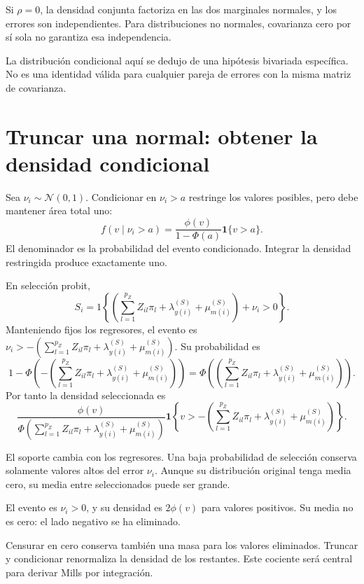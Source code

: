 \documentclass[11pt,a4paper]{article}
\begin{document}
Si \(\rho=0\), la densidad conjunta
factoriza en las dos marginales normales,
y los errores son independientes.
Para distribuciones no normales,
covarianza cero por sí sola
no garantiza esa independencia.

La distribución condicional aquí se
dedujo de una hipótesis bivariada específica.
No es una identidad válida para
cualquier pareja de errores
con la misma matriz de covarianza.


\clearpage
\section{Truncar una normal: obtener la densidad condicional}

Sea \(\nu_i\sim\mathcal N(0,1)\).
Condicionar en \(\nu_i>a\) restringe
los valores posibles, pero debe
mantener área total uno:
\[
f(v\mid\nu_i>a)
=\frac{\phi(v)}{1-\Phi(a)}\mathbf1\{v>a\}.
\]
El denominador es la probabilidad
del evento condicionado.
Integrar la densidad restringida
produce exactamente uno.

En selección probit,
\[
S_i=1\left\{\left(\sum_{l=1}^{p_Z}Z_{il}\pi_l+\lambda_{y(i)}^{(S)}+\mu_{m(i)}^{(S)}\right)+\nu_i>0\right\}.
\]
Manteniendo fijos los regresores,
el evento es
\(\nu_i>-\left(\sum_{l=1}^{p_Z}Z_{il}\pi_l+\lambda_{y(i)}^{(S)}+\mu_{m(i)}^{(S)}\right)\).
Su probabilidad es
\[
1-\Phi\left(-\left(\sum_{l=1}^{p_Z}Z_{il}\pi_l+\lambda_{y(i)}^{(S)}+\mu_{m(i)}^{(S)}\right)\right)
=\Phi\left(\left(\sum_{l=1}^{p_Z}Z_{il}\pi_l+\lambda_{y(i)}^{(S)}+\mu_{m(i)}^{(S)}\right)\right).
\]
Por tanto la densidad seleccionada es
\[
\frac{\phi(v)}
{\Phi(\sum_{l=1}^{p_Z}Z_{il}\pi_l+\lambda_{y(i)}^{(S)}+\mu_{m(i)}^{(S)})}
\mathbf1\left\{v>-\left(\sum_{l=1}^{p_Z}Z_{il}\pi_l+\lambda_{y(i)}^{(S)}+\mu_{m(i)}^{(S)}\right)\right\}.
\]

El soporte cambia con los regresores.
Una baja probabilidad de selección
conserva solamente valores altos
del error \(\nu_i\).
Aunque su distribución original
tenga media cero, su media
entre seleccionados puede ser grande.

\begin{ejemplo}
El evento es \(\nu_i>0\),
y su densidad es \(2\phi(v)\)
para valores positivos.
Su media no es cero:
el lado negativo se ha eliminado.
\end{ejemplo}
Censurar en cero conserva también
una masa para los valores eliminados.
Truncar y condicionar renormaliza
la densidad de los restantes.
Este cociente será central para
derivar Mills por integración.
\end{document}
